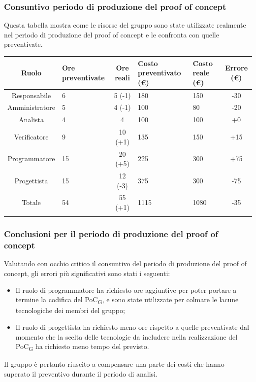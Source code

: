 \subsubsection{Consuntivo periodo di produzione del proof of concept}
Questa tabella mostra come le risorse del gruppo sono state utilizzate realmente nel periodo di produzione del proof of concept e le confronta con quelle preventivate.

\setlength\extrarowheight{5pt}
\begin{tabularx}{\textwidth}{|c|XcXX|c|}
	\hline
	\rowcolor{white}
	\textbf{Ruolo} & \textbf{Ore preventivate} & \textbf{Ore reali} & \textbf{Costo preventivato (€)} & \textbf{Costo reale (€)} & \textbf{Errore (€)} \\
	\hline
	Responsabile &6&5 (-1)&180&150&-30\\
	Amministratore &5&4 (-1)&100&80&-20\\
	Analista &4&4&100&100&+0\\
	Verificatore &9&10 (+1)&135&150&+15\\
	Programmatore &15&20 (+5)&225&300&+75\\
	Progettista &15&12 (-3)&375&300&-75\\
	\hline
	Totale &54&55 (+1)&1115&1080&-35\\
	\hline
	\rowcolor{white}
	\caption{Consuntivo ore e costi per ruolo durante il periodo di produzione del proof of concept}
\end{tabularx}

\subsubsection{Conclusioni per il periodo di produzione del proof of concept}


Valutando con occhio critico il consuntivo del periodo di produzione del proof of concept, gli errori più significativi sono stati i seguenti:
\begin{itemize}
	\item Il ruolo di programmatore ha richiesto ore aggiuntive per poter portare a termine la codifica del PoC\textsubscript{G}, e sono state utilizzate per colmare le lacune tecnologiche dei membri del gruppo;
    \item Il ruolo di progettista ha richiesto meno ore rispetto a quelle preventivate dal momento che la scelta delle tecnologie  da includere nella realizzazione del PoC\textsubscript{G} ha richiesto meno tempo del previsto.
\end{itemize}
Il gruppo è pertanto riuscito a compensare una parte dei costi che hanno superato il preventivo durante il periodo di analisi.


